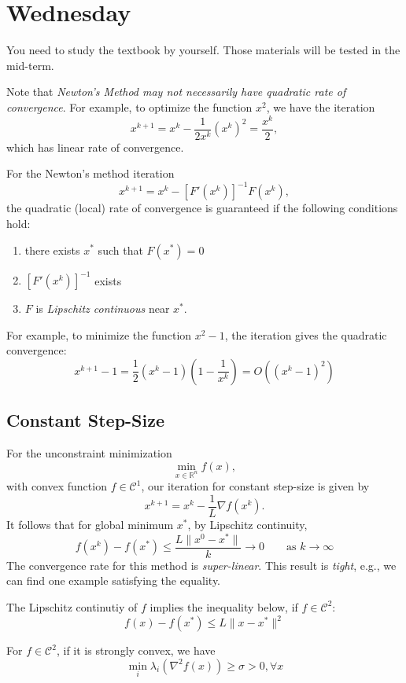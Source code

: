 
\section{Wednesday}
You need to study the textbook by yourself. Those materials will be tested in the mid-term.

Note that \emph{Newton's Method may not necessarily have quadratic rate of convergence}. For example, to optimize the function $x^2$, we have the iteration
\[
x^{k+1}=x^k-\frac{1}{2x^k}(x^k)^2=\frac{x^k}{2},
\]
which has linear rate of convergence.
\begin{proposition}
For the Newton's method iteration
\[
x^{k+1}=x^k-\left[F'(x^k)\right]^{-1}F(x^k),
\]
the quadratic (local) rate of convergence is guaranteed if the following conditions hold:
\begin{enumerate}
\item
there exists $x^*$ such that $F(x^*)=0$
\item
$\left[F'(x^k)\right]^{-1}$ exists
\item
$F$ is \emph{Lipschitz continuous} near $x^*$.
\end{enumerate}
\end{proposition}
For example, to minimize the function $x^2-1$, the iteration gives the quadratic convergence:
\[
x^{k+1} - 1=\frac{1}{2}(x^k-1)(1-\frac{1}{x^k})=
O((x^k-1)^2)
\]


\subsection{Constant Step-Size}
For the unconstraint minimization
\[
\min_{x\in\mathbb{R}^n}f(x),
\]
with convex function $f\in\mathcal{C}^1$, our iteration for constant step-size is given by
\[
x^{k+1} = x^k-\frac{1}{L}\nabla f(x^k).
\]
It follows that for global minimum $x^*$, by Lipschitz continuity,
\[
f(x^k) - f(x^*)\le\frac{L\|x^0-x^*\|}{k}\to0\qquad\mbox{as }k\to\infty
\]
The convergence rate for this method is \emph{super-linear}. This result is \emph{tight}, e.g., we can find one example satisfying the equality.

\begin{proposition}
The Lipschitz continutiy of $f$ implies the inequality below, if $f\in\mathcal{C}^2$:
\[
f(x) - f(x^*)\le L\|x-x^*\|^2
\]
\end{proposition}

For $f\in\mathcal{C}^2$, if it is strongly convex, we have
\[
\min_i\lambda_i(\nabla^2 f(x))\ge\sigma>0,\forall x
\]


